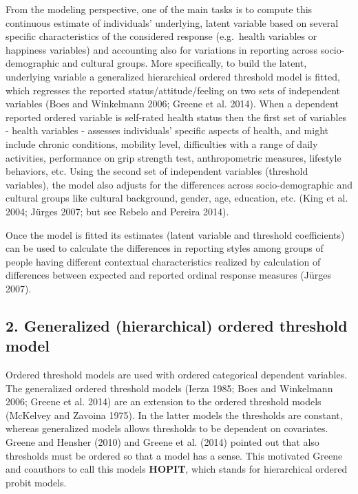 \documentclass[]{article}
\begin{document}
From the modeling perspective, one of the main tasks is to compute this
continuous estimate of individuals' underlying, latent variable based on
several specific characteristics of the considered response (e.g.~health
variables or happiness variables) and accounting also for variations in
reporting across socio-demographic and cultural groups. More
specifically, to build the latent, underlying variable a generalized
hierarchical ordered threshold model is fitted, which regresses the
reported status/attitude/feeling on two sets of independent variables
(Boes and Winkelmann 2006; Greene et al. 2014). When a dependent
reported ordered variable is self-rated health status then the first set
of variables - health variables - assesses individuals' specific aspects
of health, and might include chronic conditions, mobility level,
difficulties with a range of daily activities, performance on grip
strength test, anthropometric measures, lifestyle behaviors, etc. Using
the second set of independent variables (threshold variables), the model
also adjusts for the differences across socio-demographic and cultural
groups like cultural background, gender, age, education, etc. (King et
al. 2004; Jürges 2007; but see Rebelo and Pereira 2014).

Once the model is fitted its estimates (latent variable and threshold
coefficients) can be used to calculate the differences in reporting
styles among groups of people having different contextual
characteristics realized by calculation of differences between expected
and reported ordinal response measures (Jürges 2007).

\hypertarget{generalized-hierarchical-ordered-threshold-model}{%
\subsection{2. Generalized (hierarchical) ordered threshold
model}\label{generalized-hierarchical-ordered-threshold-model}}

Ordered threshold models are used with ordered categorical dependent
variables. The generalized ordered threshold models (Ierza 1985; Boes
and Winkelmann 2006; Greene et al. 2014) are an extension to the ordered
threshold models (McKelvey and Zavoina 1975). In the latter models the
thresholds are constant, whereas generalized models allows thresholds to
be dependent on covariates. Greene and Hensher (2010) and Greene et al.
(2014) pointed out that also thresholds must be ordered so that a model
has a sense. This motivated Greene and coauthors to call this models
\textbf{HOPIT}, which stands for hierarchical ordered probit models.
\end{document}
